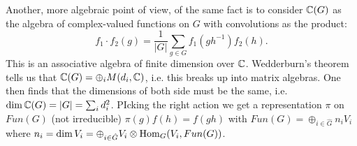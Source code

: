 \documentclass{../mathnotes}
\begin{document}
Another, more algebraic point of view, of the same fact is to consider $\mathbb{C}(G)$ as the algebra of complex-valued functions on $G$ with convolutions
as the product:
\[f_1\cdot f_2(g)=\frac{1}{|G|}\sum_{g\in G}f_1(gh^{-1})f_2(h).\]
This is an associative algebra of finite dimension over $\mathbb{C}$. Wedderburn's theorem tells us that $\mathbb{C}(G)=\oplus_i M(d_i,\mathbb{C})$, i.e. this breaks up
into matrix algebras. One then finds that the dimensions of both side must be the same, i.e. $\dim\mathbb{C}(G)=|G|=\sum_id_i^2$. PIcking the right action
we get a representation $\pi$ on $Fun(G)$ (not irreducible) $\pi(g)f(h)=f(gh)$ with $Fun(G)=\oplus_{i\in\hat G}n_iV_i$ where $n_i=\dim V_i=\oplus_{i\in\hat G}V_i\otimes\operatorname{Hom}_G(V_i,Fun(G))$.
\end{document}
